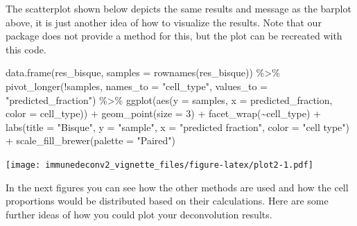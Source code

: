 \documentclass[
]{article}
\newenvironment{Shaded}{\begin{snugshade}}{\end{snugshade}}
\newcommand{\AttributeTok}[1]{\textcolor[rgb]{0.77,0.63,0.00}{#1}}
\newcommand{\DecValTok}[1]{\textcolor[rgb]{0.00,0.00,0.81}{#1}}
\newcommand{\FunctionTok}[1]{\textcolor[rgb]{0.00,0.00,0.00}{#1}}
\newcommand{\NormalTok}[1]{#1}
\newcommand{\SpecialCharTok}[1]{\textcolor[rgb]{0.00,0.00,0.00}{#1}}
\newcommand{\StringTok}[1]{\textcolor[rgb]{0.31,0.60,0.02}{#1}}
\begin{document}
The scatterplot shown below depicts the same results and message as the
barplot above, it is just another idea of how to visualize the results.
Note that our package does not provide a method for this, but the plot
can be recreated with this code.

\begin{Shaded}
\begin{Highlighting}[]
\FunctionTok{data.frame}\NormalTok{(res\_bisque, }\AttributeTok{samples =} \FunctionTok{rownames}\NormalTok{(res\_bisque)) }\SpecialCharTok{\%\textgreater{}\%} \FunctionTok{pivot\_longer}\NormalTok{(}\SpecialCharTok{!}\NormalTok{samples, }
    \AttributeTok{names\_to =} \StringTok{"cell\_type"}\NormalTok{, }\AttributeTok{values\_to =} \StringTok{"predicted\_fraction"}\NormalTok{) }\SpecialCharTok{\%\textgreater{}\%} 
    \FunctionTok{ggplot}\NormalTok{(}\FunctionTok{aes}\NormalTok{(}\AttributeTok{y =}\NormalTok{ samples, }\AttributeTok{x =}\NormalTok{ predicted\_fraction, }\AttributeTok{color =}\NormalTok{ cell\_type)) }\SpecialCharTok{+} 
    \FunctionTok{geom\_point}\NormalTok{(}\AttributeTok{size =} \DecValTok{3}\NormalTok{) }\SpecialCharTok{+} \FunctionTok{facet\_wrap}\NormalTok{(}\SpecialCharTok{\textasciitilde{}}\NormalTok{cell\_type) }\SpecialCharTok{+} \FunctionTok{labs}\NormalTok{(}\AttributeTok{title =} \StringTok{"Bisque"}\NormalTok{, }
    \AttributeTok{y =} \StringTok{"sample"}\NormalTok{, }\AttributeTok{x =} \StringTok{"predicted fraction"}\NormalTok{, }\AttributeTok{color =} \StringTok{"cell type"}\NormalTok{) }\SpecialCharTok{+} 
    \FunctionTok{scale\_fill\_brewer}\NormalTok{(}\AttributeTok{palette =} \StringTok{"Paired"}\NormalTok{)}
\end{Highlighting}
\end{Shaded}

\texttt{[image: immunedeconv2\_vignette\_files/figure-latex/plot2-1.pdf]}

In the next figures you can see how the other methods are used and how
the cell proportions would be distributed based on their calculations.
Here are some further ideas of how you could plot your deconvolution
results.
\end{document}
